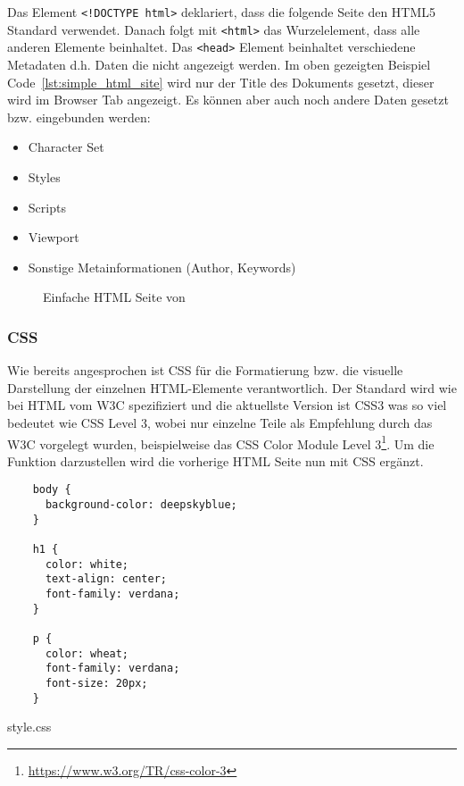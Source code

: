 Das Element \verb|<!DOCTYPE html>| deklariert, dass die folgende Seite den HTML5
Standard verwendet. Danach folgt mit \verb|<html>| das Wurzelelement, dass alle
anderen Elemente beinhaltet. Das \verb|<head>| Element beinhaltet verschiedene
Metadaten d.h. Daten die nicht angezeigt werden. Im oben gezeigten Beispiel
Code~\ref{lst:simple_html_site} wird nur der Title des Dokuments gesetzt, dieser
wird im Browser Tab angezeigt. Es können aber auch noch andere Daten gesetzt
bzw. eingebunden werden:

\begin{itemize}
  \item Character Set
  \item Styles
  \item Scripts
  \item Viewport
  \item Sonstige Metainformationen (Author, Keywords)
\end{itemize}

\begin{figure}[H]
  \centering
  \caption{Einfache HTML Seite von }
\end{figure}

\subsubsection{CSS}
Wie bereits angesprochen ist \ac*{CSS} für die Formatierung bzw. die visuelle
Darstellung der einzelnen HTML-Elemente verantwortlich. Der Standard wird wie
bei HTML vom \acs*{W3C} spezifiziert und die aktuellste Version ist CSS3 was so
viel bedeutet wie \acs*{CSS} Level 3, wobei nur einzelne Teile als Empfehlung
durch das \acs*{W3C} vorgelegt wurden, beispielweise das CSS Color Module Level
3\footnote{\url{https://www.w3.org/TR/css-color-3}}. Um die Funktion
darzustellen wird die vorherige HTML Seite nun mit CSS ergänzt.

\begin{listing}[H]
  \begin{verbatim}
    body {
      background-color: deepskyblue;
    }

    h1 {
      color: white;
      text-align: center;
      font-family: verdana;
    }

    p {
      color: wheat;
      font-family: verdana;
      font-size: 20px;
    }
  \end{verbatim}
  \caption{style.css}
\end{listing}

